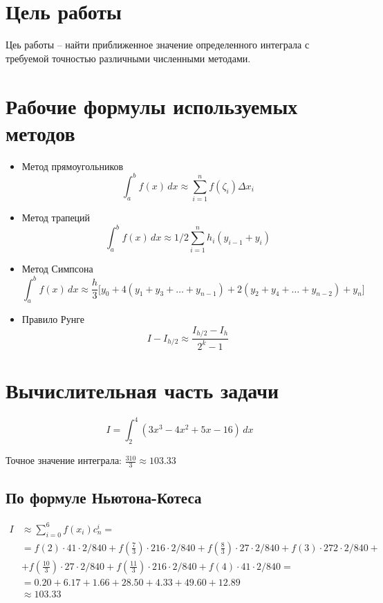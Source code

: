 \section{Цель работы}
Цеь работы -- найти приближенное значение определенного интеграла с требуемой точностью различными численными методами.
\section{Рабочие формулы используемых методов}
\begin{itemize}
	\item Метод прямоугольников
	      \[ \int_a^b f(x) \, dx \approx \sum_{i=1}^n f(\zeta_i) \Delta x_i \]
	\item Метод трапеций
	      \[ \int_a^b f(x) \, dx \approx 1/2 \sum_{i=1}^n h_i (y_{i-1} + y_i) \]
	\item Метод Симпсона
	      \[
		      \int_a^b f(x) \, dx \approx
		      \frac{h}{3} \Big[ y_0 + 4 (y_1 + y_3 + \ldots + y_{n-1}) + 2(y_2 + y_4 + \ldots + y_{n-2}) + y_n  \Big]
	      \]
	\item Правило Рунге
	      \[ I - I_{h/2} \approx \frac{I_{h/2} - I_{h}}{2^k - 1} \]
\end{itemize}

\section{Вычислительная часть задачи}
\[
	I = \int_2^4 (3 x^3 - 4 x^2 + 5 x - 16) \, dx
\]

Точное значение интеграла: \(\frac{310}{3} \approx 103.33\)

\subsection{По формуле Ньютона-Котеса}
\begin{align*}
	I & \approx \sum_{i=0}^6 f(x_i) c_n^i =                   \\
	  & =
	f(2) \cdot 41 \cdot 2 / 840 +
	f\left(\frac{7}{3}\right) \cdot 216 \cdot 2 / 840 +
	f\left(\frac{8}{3}\right) \cdot 27 \cdot 2 / 840 +
	f(3) \cdot 272 \cdot 2 / 840 +                            \\
	  & + f\left(\frac{10}{3}\right) \cdot 27 \cdot 2 / 840 +
	f\left(\frac{11}{3}\right) \cdot 216 \cdot 2 / 840 +
	f(4) \cdot 41 \cdot 2 / 840 =                             \\
	  & =
	0.20 + 6.17 + 1.66 + 28.50 + 4.33 + 49.60 + 12.89         \\
	  & \approx 103.33
\end{align*}

